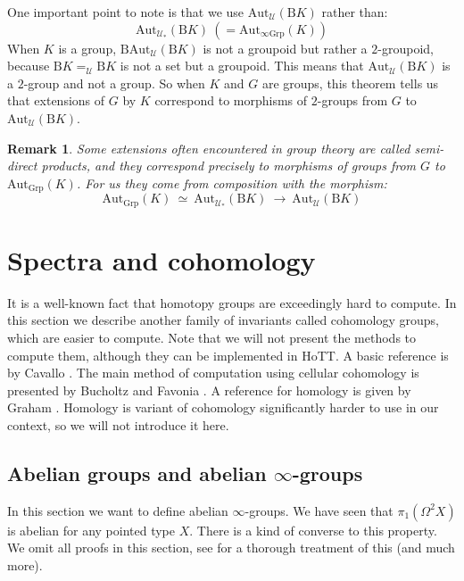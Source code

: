\documentclass{article}
\newcommand{\se}[1]{\medbreak \medbreak \section{#1}}
\newcommand{\sse}[1]{\medbreak \subsection{#1}}
\newcommand{\U}{{\mathcal U}}
\renewcommand{\r}{\rightarrow}
\newcommand{\Grp}{\mathrm{Grp}}
\newcommand{\B}{\mathrm{B}}
\newcommand{\Aut}{\mathrm{Aut}}
\newtheorem{definition}{Definition}
\newtheorem{remark}{Remark}
\begin{document}
One important point to note is that we use $\Aut_\U(\B K)$ rather than: 
\[\Aut_{\U_*}(\B K)\ (=\Aut_{\infty\Grp}(K))\] 
When $K$ is a group, $\B\Aut_\U(\B K)$ is not a groupoid but rather a $2$-groupoid, because $\B K =_\U\B K$ is not a set but a groupoid. This means that $\Aut_\U(\B K)$ is a $2$-group and not a group. So when $K$ and $G$ are groups, this theorem tells us that extensions of $G$ by $K$ correspond to morphisms of $2$-groups from $G$ to $\Aut_\U(\B K)$.

\begin{remark}
Some extensions often encountered in group theory are called semi-direct products, and they correspond precisely to morphisms of groups from $G$ to $\Aut_\Grp(K)$. For us they come from composition with the morphism:
\[\Aut_\Grp(K) \ \simeq\ \Aut_{\U_*}(\B K) \ \r \ \Aut_\U(\B K)\]
\end{remark}




\se{Spectra and cohomology}

It is a well-known fact that homotopy groups are exceedingly hard to compute. In this section we describe another family of invariants called cohomology groups, which are easier to compute. Note that we will not present the methods to compute them, although they can be implemented in HoTT. A basic reference is by Cavallo \cite{cavallo2015synthetic}. The main method of computation using cellular cohomology is presented by Bucholtz and Favonia \cite{buchholtz2018cellular}. A reference for homology is given by Graham \cite{graham2017synthetic}. Homology is variant of cohomology significantly harder to use in our context, so we will not introduce it here. %


\sse{Abelian groups and abelian $\infty$-groups}

In this section we want to define abelian $\infty$-groups. We have seen that $\pi_1(\Omega^2 X)$ is abelian for any pointed type $X$. There is a kind of converse to this property. We omit all proofs in this section, see \cite{buchholtz2018higher} for a thorough treatment of this (and much more).%

\end{document}
